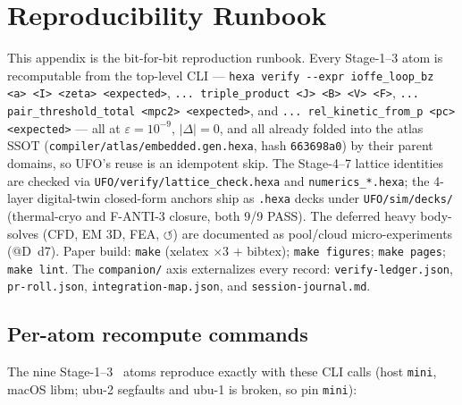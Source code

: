 \section{Reproducibility Runbook}
\label{app:repro}

This appendix is the bit-for-bit reproduction runbook. Every Stage-1--3
atom is recomputable from the top-level CLI ---
\verb|hexa verify --expr ioffe_loop_bz <a> <I> <zeta> <expected>|,
\verb|... triple_product <J> <B> <V> <F>|,
\verb|... pair_threshold_total <mpc2> <expected>|, and
\verb|... rel_kinetic_from_p <pc> <expected>| --- all at
$\varepsilon=10^{-9}$, $|\Delta|=0$, and all already folded into the
atlas SSOT (\verb|compiler/atlas/embedded.gen.hexa|, hash
\texttt{663698a0}) by their parent domains, so UFO's reuse is an
idempotent skip. The Stage-4--7 lattice identities are checked via
\verb|UFO/verify/lattice_check.hexa| and \verb|numerics_*.hexa|; the
4-layer digital-twin closed-form anchors ship as \verb|.hexa| decks
under \verb|UFO/sim/decks/| (thermal-cryo and F-ANTI-3 closure, both
9/9 PASS). The deferred heavy body-solves (CFD, EM 3D, FEA,
$\circlearrowleft$) are documented as pool/cloud micro-experiments
(@D~d7). Paper build: \texttt{make} (xelatex $\times3$ $+$ bibtex);
\texttt{make figures}; \texttt{make pages}; \texttt{make lint}. The
\texttt{companion/} axis externalizes every record:
\texttt{verify-ledger.json}, \texttt{pr-roll.json},
\texttt{integration-map.json}, and \texttt{session-journal.md}.

\subsection{Per-atom recompute commands}
\label{app:repro-atoms}

The nine Stage-1--3 \tierGreen\ atoms reproduce exactly with these CLI
calls (host \texttt{mini}, macOS libm; ubu-2 segfaults and ubu-1 is
broken, so pin \texttt{mini}):

